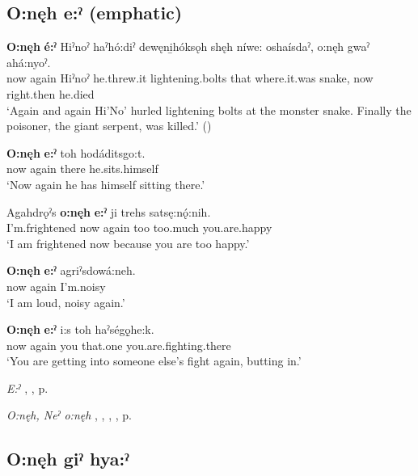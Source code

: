 \subsection*{\textbf{O:nęh e:ˀ}  (emphatic)} \label{p:[o:nęh e:ˀ]}

\ea
\label{ex:opart28}
\gll \textbf{O:nęh} \textbf{é:ˀ} Hiˀnoˀ haˀhó:diˀ dewęni̱hóksǫh shęh níwe: oshaísdaˀ, o:nęh gwaˀ ahá:nyoˀ.\\
now again Hiˀnoˀ he.threw.it lightening.bolts that where.it.was snake, now right.then he.died\\
\glt ‘Again and again Hi’No’ hurled lightening bolts at the monster snake. Finally the poisoner, the giant serpent, was killed.’ (\cite{carrier_legends_2013})
\z

\ea
\label{ex:opart29}
\gll \textbf{O:nęh} \textbf{e:ˀ}  toh hodáditsgo:t.\\
now again there he.sits.himself\\
\glt ‘Now again he has himself sitting there.’
\z

\ea
\label{ex:opart30}
\gll Agahdrǫˀs \textbf{o:nęh} \textbf{e:ˀ} ji trehs satsę:nǫ́:nih.\\
I’m.frightened now again too too.much you.are.happy\\
\glt ‘I am frightened now because you are too happy.’
\z

\ea
\label{ex:opart31}
\gll \textbf{O:nęh} \textbf{e:ˀ}  agriˀsdowá:neh.\\
now again I’m.noisy\\
\glt ‘I am loud, noisy again.’
\z

\ea
\label{ex:opart32}
\gll \textbf{O:nęh} \textbf{e:ˀ} i:s toh haˀségǫ̱he:k.\\
now again you that.one you.are.fighting.there\\
\glt ‘You are getting into someone else’s fight again, butting in.’
\z

\begin{CayugaRelated}
\item \textit{E:ˀ} , , p. \pageref{p:[e:ˀ]}\\
\item \textit{O:nęh, Neˀ o:nęh} , , , , p. \pageref{p:[o:nęh]}
\end{CayugaRelated}


\subsection*{\textbf{O:nęh giˀ hya:ˀ} } \label{p:[o:nęh giˀ hya:ˀ]}

